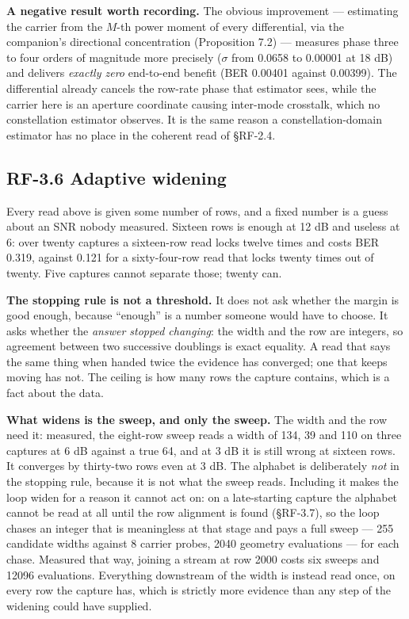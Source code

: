 \documentclass[10pt,letterpaper,twocolumn]{article}
\begin{document}
\textbf{A negative result worth recording.} The obvious improvement --- estimating the carrier from the \(M\)-th power moment of every differential, via the companion's directional concentration (Proposition 7.2) --- measures phase three to four orders of magnitude more precisely (\(\sigma\) from 0.0658 to 0.00001 at 18 dB) and delivers \emph{exactly zero} end-to-end benefit (BER 0.00401 against 0.00399). The differential already cancels the row-rate phase that estimator sees, while the carrier here is an aperture coordinate causing inter-mode crosstalk, which no constellation estimator observes. It is the same reason a constellation-domain estimator has no place in the coherent read of §RF-2.4.

\subsection{RF-3.6 Adaptive widening}\label{rf-36-adaptive-widening}

Every read above is given some number of rows, and a fixed number is a guess about an SNR nobody measured. Sixteen rows is enough at 12 dB and useless at 6: over twenty captures a sixteen-row read locks twelve times and costs BER 0.319, against 0.121 for a sixty-four-row read that locks twenty times out of twenty. Five captures cannot separate those; twenty can.

\textbf{The stopping rule is not a threshold.} It does not ask whether the margin is good enough, because ``enough'' is a number someone would have to choose. It asks whether the \emph{answer stopped changing}: the width and the row are integers, so agreement between two successive doublings is exact equality. A read that says the same thing when handed twice the evidence has converged; one that keeps moving has not. The ceiling is how many rows the capture contains, which is a fact about the data.

\textbf{What widens is the sweep, and only the sweep.} The width and the row need it: measured, the eight-row sweep reads a width of 134, 39 and 110 on three captures at 6 dB against a true 64, and at 3 dB it is still wrong at sixteen rows. It converges by thirty-two rows even at 3 dB. The alphabet is deliberately \emph{not} in the stopping rule, because it is not what the sweep reads. Including it makes the loop widen for a reason it cannot act on: on a late-starting capture the alphabet cannot be read at all until the row alignment is found (§RF-3.7), so the loop chases an integer that is meaningless at that stage and pays a full sweep --- 255 candidate widths against 8 carrier probes, 2040 geometry evaluations --- for each chase. Measured that way, joining a stream at row 2000 costs six sweeps and 12096 evaluations. Everything downstream of the width is instead read once, on every row the capture has, which is strictly more evidence than any step of the widening could have supplied.
\end{document}
